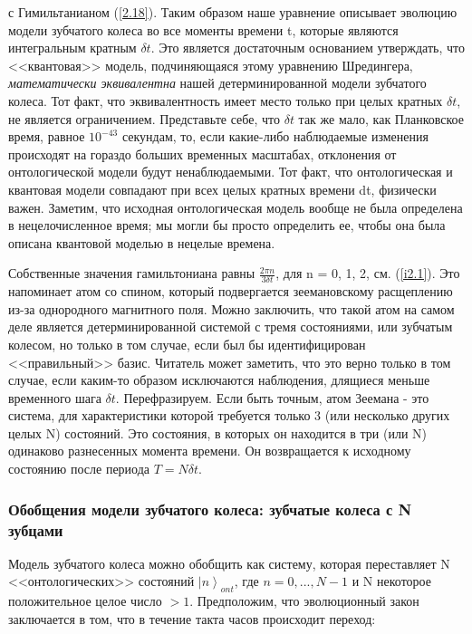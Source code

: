 \documentclass[main.tex]{subfiles}
\begin{document}
с Гимильтанианом (\ref{2.18}). Таким образом наше уравнение описывает эволюцию модели зубчатого колеса во все моменты времени t, которые являются интегральным кратным $\delta t$. Это является достаточным основанием утверждать, что <<квантовая>> модель, подчиняющаяся этому уравнению Шредингера, \textit{математически эквивалентна} нашей детерминированной модели зубчатого колеса. Тот факт, что эквивалентность имеет место только при целых кратных $\delta t$, не является ограничением. Представьте себе, что $\delta t$ так же мало, как Планковское время, равное $10^{-43}$ секундам, то, если какие-либо наблюдаемые изменения происходят на гораздо больших временных масштабах, отклонения от онтологической модели будут ненаблюдаемыми. Тот факт, что онтологическая и квантовая модели совпадают при всех целых кратных времени dt, физически важен. Заметим, что исходная онтологическая модель вообще не была определена в нецелочисленное время; мы могли бы просто определить ее, чтобы она была описана квантовой моделью в нецелые времена.   

Собственные значения гамильтониана равны $\frac{2 \pi n}{3 \delta t}$, для n = 0, 1, 2, см. (\ref{i2.1}). Это напоминает атом со спином, который подвергается зеемановскому расщеплению из-за однородного магнитного поля. Можно заключить, что такой атом на самом деле является детерминированной системой с тремя состояниями, или зубчатым колесом, но только в том случае, если был бы идентифицирован <<правильный>> базис. Читатель может заметить, что это верно только в том случае, если каким-то образом исключаются наблюдения, длящиеся меньше временного шага $\delta t$. Перефразируем. Если быть точным, атом Зеемана - это система, для характеристики которой требуется только 3 (или несколько других целых N) состояний. Это состояния, в которых он находится в три (или N) одинаково разнесенных момента времени. Он возвращается к исходному состоянию после периода $T = N\delta t $.


\subsubsection{Обобщения модели зубчатого колеса: зубчатые колеса с N зубцами}\label{ch2.2.1}

Модель зубчатого колеса можно обобщить как систему, которая переставляет N <<онтологических>> состояний $\left|n\right>_{ont}$, где $n = 0, ..., N-1$ и N некоторое положительное целое число $> 1$. Предположим, что эволюционный закон заключается в том, что в течение такта часов происходит переход:
\end{document}
